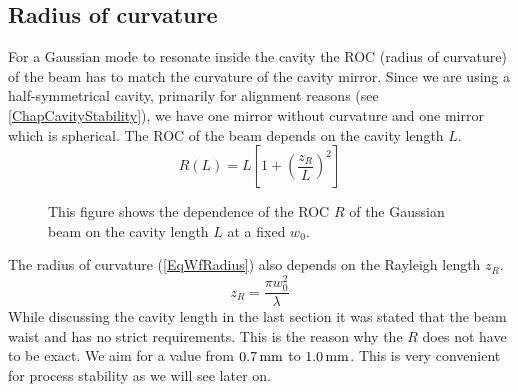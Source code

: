 \subsection{Radius of curvature}
For a Gaussian mode to resonate inside the cavity the ROC (radius of curvature) of the beam has to match the curvature of the cavity mirror. Since we are using a half-symmetrical cavity, primarily for alignment reasons (see \autoref{ChapCavityStability}), we have one mirror without curvature and one mirror which is spherical. The ROC of the beam depends on the cavity length $L$.
\begin{equation}\label{EqWfRadius}
	R(L)=L\left[1+\left(\frac{z_{\si{R}}}{L}\right)^2\right]
\end{equation}
\begin{figure}[H]
	
	\caption{This figure shows the dependence of the ROC $R$ of the Gaussian beam on the cavity length $L$ at a fixed $w_0$.}
\end{figure}
The radius of curvature (\autoref{EqWfRadius}) also depends on the Rayleigh length $z_{\si{R}}$.
\begin{equation}\label{EqRayleighRange}
	z_{\si{R}}=\frac{\pi w_0^2}{\lambda}
\end{equation}
While discussing the cavity length in the last section it was stated that the beam waist and has no strict requirements. This is the reason why the $R$ does not have to be exact. We aim for a value from $0.7\,\text{mm}$ to $1.0\,\text{mm}$. This is very convenient for process stability as we will see later on.

